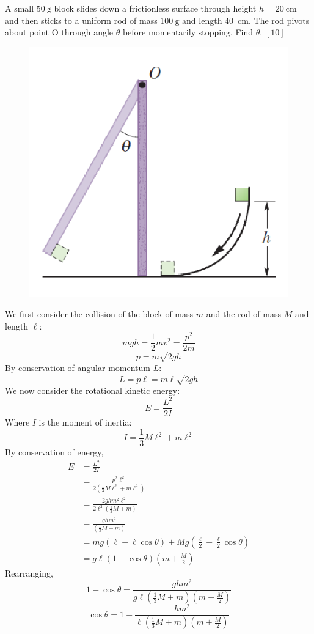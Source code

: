 \begin{problem}
    A small $\qty{50}{\g}$ block slides down a frictionless surface through height $h = \qty{20}{\cm}$ and then sticks to a uniform rod of mass $\qty{100}{\g}$ and length \qty{40}{cm}. The rod pivots about point O through angle $\theta$ before momentarily stopping. Find $\theta$. \hfill $[10]$
    \begin{figure}[H]
        \centering
        \includegraphics{spho_book_TYS_images/2021SPhO_7.png}
    \end{figure}
\end{problem}
\begin{solution}
    We first consider the collision of the block of mass $m$ and the rod of mass $M$ and length $\ell$:
    \[mgh = \frac{1}{2}mv^2 = \frac{p^2}{2m}\]
    \[p = m\sqrt{2gh}\]
    By conservation of angular momentum $L$:
    \[L = p\ell = m\ell\sqrt{2gh}\]
    We now consider the rotational kinetic energy:
    \[E = \frac{L^2}{2I}\]
    Where $I$ is the moment of inertia:
    \[I = \frac{1}{3}M\ell^2 + m\ell^2\]
    By conservation of energy,
    \begin{equation}
        \begin{split}
            E &= \frac{L^2}{2I} \\
            &= \frac{p^2\ell^2}{2(\frac{1}{3}M\ell^2 + m\ell^2)}\\
            &= \frac{2ghm^2\ell^2}{2\ell^2(\frac{1}{3}M + m)}\\
            &= \frac{ghm^2}{(\frac{1}{3}M + m)}\\
            &= mg(\ell-\ell\cos\theta)+Mg(\frac{\ell}{2}-\frac{\ell}{2}\cos\theta)\\
            &= g\ell(1-\cos\theta)(m+\frac{M}{2})
        \end{split}
    \end{equation}
    Rearranging,
    \[1-\cos\theta = \frac{ghm^2}{g\ell(\frac{1}{3}M + m)(m+\frac{M}{2})}\]
    \[\boxed{\cos\theta = 1-\frac{hm^2}{\ell(\frac{1}{3}M + m)(m+\frac{M}{2})}}\]
\end{solution}
